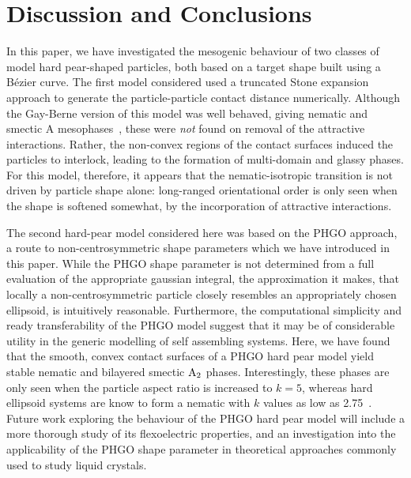 \documentclass[%
reprint,
superscriptaddress,
showpacs,
 amsmath,amssymb,
 aps,
floatfix,
]{revtex4-1}
\begin{document}
\section{Discussion and Conclusions}
\label{S:GBP_conclusions}

In this paper, we have investigated the mesogenic behaviour of two
classes of model hard pear-shaped particles, both based on a
target shape built using a B\'{e}zier curve. The first model
considered used a truncated Stone expansion approach to generate the
particle-particle contact distance numerically. Although the
Gay-Berne version of this model was well behaved, giving nematic
and smectic A mesophases~\cite{Berardi_Ricci_01}, these were
\emph{not} found on removal of the attractive interactions.
Rather, the non-convex regions of the contact surfaces induced the
particles to interlock, leading to the formation of multi-domain
and glassy phases. For this model, therefore, it appears that the
nematic-isotropic transition is not driven by particle shape
alone: long-ranged orientational order is only seen when the shape
is softened somewhat, by the incorporation of attractive
interactions.

The second hard-pear model considered here was based on the PHGO
approach, a route to non-centrosymmetric shape parameters which we
have introduced in this paper. While the PHGO shape parameter is
not determined from a full evaluation of the appropriate gaussian
integral, the approximation it makes, that locally a
non-centrosymmetric particle closely resembles an appropriately
chosen ellipsoid, is intuitively reasonable. Furthermore, the
computational simplicity and ready transferability of the PHGO
model suggest that it may be of considerable utility in the
generic modelling of self assembling systems. Here, we have found
that the smooth, convex contact surfaces of a PHGO hard pear model
yield stable nematic and bilayered smectic ${\rm A_2}$ phases.
Interestingly, these phases are only seen when the particle aspect
ratio is increased to $k=5$, whereas hard ellipsoid systems are
know to form a nematic with $k$ values as low as
2.75~\cite{FrenkelMulder85}. Future work exploring the behaviour
of the PHGO hard pear model will include a more thorough study of
its flexoelectric properties, and an investigation into the
applicability of the PHGO shape parameter in theoretical
approaches commonly used to study liquid crystals.
\end{document}
